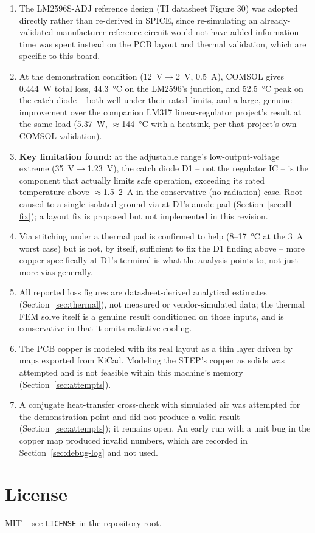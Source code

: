 \documentclass[11pt,letterpaper]{article}
\begin{document}
\begin{enumerate}
    \item The LM2596S-ADJ reference design (TI datasheet Figure 30) was adopted directly rather than
    re-derived in SPICE, since re-simulating an already-validated manufacturer reference circuit would not
    have added information -- time was spent instead on the PCB layout and thermal validation, which are
    specific to this board.
    \item At the demonstration condition (\SI{12}{\volt}$\to$\SI{2}{\volt}, \SI{0.5}{\ampere}), COMSOL
    gives \SI{0.444}{\watt} total loss, \SI{44.3}{\celsius} on the LM2596's junction, and
    \SI{52.5}{\celsius} peak on the catch diode -- both well under their rated limits, and a large,
    genuine improvement over the companion LM317 linear-regulator project's result at the same load
    (\SI{5.37}{\watt}, $\approx$\SI{144}{\celsius} with a heatsink, per that project's own COMSOL
    validation).
    \item \textbf{Key limitation found:} at the adjustable range's low-output-voltage extreme
    (\SI{35}{\volt}$\to$\SI{1.23}{\volt}), the catch diode D1 -- not the regulator IC -- is the component
    that actually limits safe operation, exceeding its rated temperature above
    $\approx$\SI{1.5}{}--\SI{2}{\ampere} in the conservative (no-radiation) case. Root-caused to a single
    isolated ground via at D1's anode pad (Section~\ref{sec:d1-fix}); a layout fix is proposed but not
    implemented in this revision.
    \item Via stitching under a thermal pad is confirmed to help (\SI{8}{}--\SI{17}{\celsius} at the
    \SI{3}{\ampere} worst case) but is not, by itself, sufficient to fix the D1 finding above -- more
    copper specifically at D1's terminal is what the analysis points to, not just more vias generally.
    \item All reported loss figures are datasheet-derived analytical estimates (Section~\ref{sec:thermal}),
    not measured or vendor-simulated data; the thermal FEM solve itself is a genuine result conditioned on
    those inputs, and is conservative in that it omits radiative cooling.
    \item The PCB copper is modeled with its real layout as a thin layer driven by maps exported from
    KiCad. Modeling the STEP's copper as solids was attempted and is not feasible within this machine's
    memory (Section~\ref{sec:attempts}).
    \item A conjugate heat-transfer cross-check with simulated air was attempted for the demonstration
    point and did not produce a valid result (Section~\ref{sec:attempts}); it remains open. An early run
    with a unit bug in the copper map produced invalid numbers, which are recorded in
    Section~\ref{sec:debug-log} and not used.
\end{enumerate}

\section{License}

MIT -- see \texttt{LICENSE} in the repository root.
\end{document}
